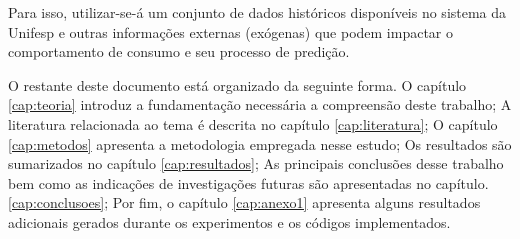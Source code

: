 Para isso, utilizar-se-á um conjunto de dados históricos disponíveis no sistema da Unifesp e outras informações externas (exógenas) que podem impactar o comportamento de consumo e seu processo de predição.



O restante deste documento está organizado da seguinte forma. O  capítulo \ref{cap:teoria} introduz a fundamentação necessária a compreensão deste trabalho; A literatura relacionada ao tema é descrita no capítulo \ref{cap:literatura}; O capítulo \ref{cap:metodos} apresenta a metodologia empregada nesse estudo; Os resultados são sumarizados no capítulo \ref{cap:resultados}; As principais conclusões desse trabalho bem como as indicações de investigações futuras são apresentadas no capítulo. \ref{cap:conclusoes}; Por fim, o capítulo \ref{cap:anexo1} apresenta alguns resultados adicionais gerados durante os experimentos e os códigos implementados.

